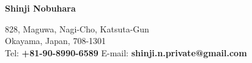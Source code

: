 \begin{center}
    \begin{large}
       \textbf{Shinji Nobuhara}\\
    \end{large}
    828, Maguwa, Nagi-Cho, Katsuta-Gun \\
    Okayama, Japan, 708-1301 \\
    Tel: \textbf{+81-90-8990-6589} \hfill E-mail: \textbf{shinji.n.private@gmail.com} \\
\end{center}